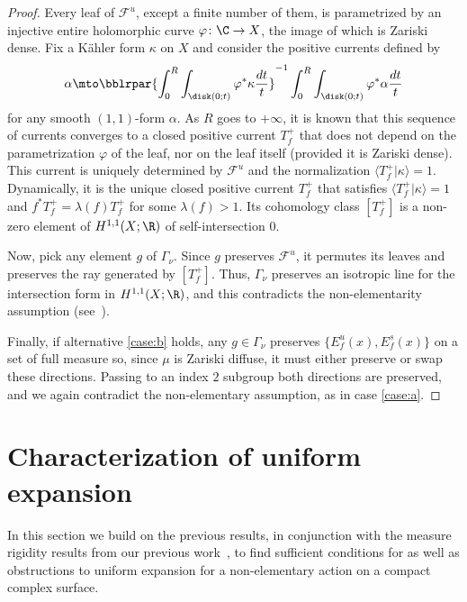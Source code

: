 \begin{proof}
Every leaf of $\mathcal F^u$, except a finite number of them, is parametrized by an injective entire holomorphic curve $\varphi\colon \C\to X$, the image of which is Zariski dense.
Fix a Kähler form $\kappa$ on $X$ and consider the positive currents defined by
\begin{equation*}
\alpha\mto \bblrpar{\int_0^R\int_{\disk(0;t)} \varphi^*\kappa \frac{dt}{t}}^{-1} \int_0^R\int_{\disk(0;t)} \varphi^*\alpha \frac{dt}{t}
\end{equation*}
for any smooth $(1,1)$-form $\alpha$. As $R$ goes to $+\infty$, it is known that this sequence of currents converges to a closed positive current $T^+_f$
that does not depend on the parametrization $\varphi$ of the leaf, nor on the leaf itself (provided it is Zariski dense).
This current is uniquely determined by $\mathcal F^u$ and the normalization $\langle T^+_f\vert \kappa \rangle= 1$. Dynamically, it is
the unique closed positive current $T^+_f$ that satisfies $\langle T^+_f\vert \kappa \rangle= 1$ and $f^*T^+_f=\lambda(f)T^+_f$ for some $\lambda(f)>1$.
Its cohomology class $[T^+_f]$ is a non-zero element of $H^{1,1}(X;\R)$ of self-intersection $0$.

Now, pick any element $g$ of $\Gamma_\nu$. Since $g$ preserves $\mathcal F^u$, it permutes its leaves and preserves the ray generated by $[T^+_f]$.
Thus, $\Gamma_\nu$ preserves an isotropic line for the intersection form in $H^{1,1}(X;\R)$, and this contradicts the non-elementarity assumption (see~\cite[\S 2.3]{stiffness}).

Finally, if alternative \eqref{case:b} holds, any $g\in \Gamma_\nu$ preserves
$ \{E^u_f(x), E^s_f(x)\}$ on a set of full measure so,
since $\mu$ is Zariski diffuse,
it must either preserve or
swap these directions. Passing to an index $2$ subgroup both directions are preserved, and we again contradict the non-elementary assumption, as in case \eqref{case:a}.
\end{proof}

\section{Characterization of uniform expansion}\label{sec:characterization}
In this section we build on the previous results, in conjunction with the measure rigidity
results from our previous work~\cite{stiffness},
to find sufficient conditions for as well as obstructions to
uniform expansion for a non-elementary action on a compact complex surface.


